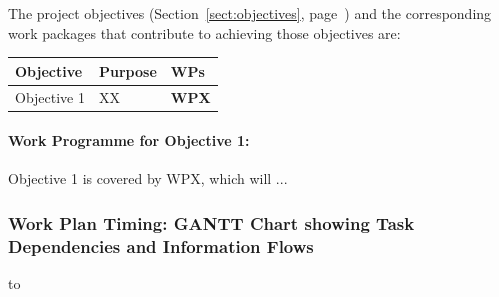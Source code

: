 \documentclass[a4paper,11pt]{article}
\begin{document}

The project objectives (Section~\ref{sect:objectives},
page~\pageref{sect:objectives}) and the corresponding work
packages that contribute to achieving those objectives are:

\begin{center}
\begin{tabular}{|l|l|l|}\hline
\textbf{Objective} & \textbf{Purpose} & \textbf{WPs} \\\hline \hline
Objective 1 & XX & \textbf{WPX} \\\hline
\end{tabular}
\end{center}

\paragraph*{Work Programme for Objective 1: }

Objective 1 is covered by WPX, which will ...

\landscape

\subsubsection*{Work Plan Timing: GANTT Chart showing Task Dependencies and Information Flows}


\vspace{-0.7in} \centerline{\hbox to \columnwidth{\hss%
\hss}}
\label{fig:gantt}
\vspace{-1in} %
\endlandscape

\newpage

%


\addtocounter{subsubsection}{1}
\fbox{\begin{minipage}{\textwidth}\begin{center}{\Large\bf
        Work package list} %
  \end{center}
  \end{minipage}}

\bigskip\bigskip
\end{document}
